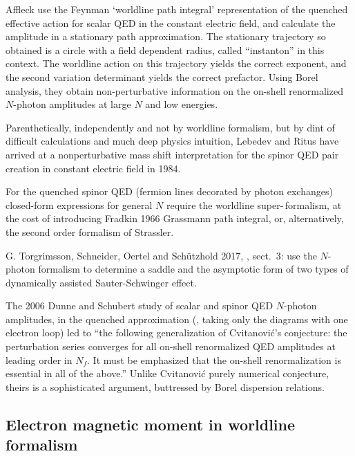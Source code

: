 Affleck \etal{} use the Feynman `worldline
path integral' representation of the quenched effective action for scalar
QED in the constant electric field, and calculate the amplitude in a
stationary path approximation. The stationary trajectory so obtained is a
circle with a field dependent radius, called ``instanton''  in this
context. The worldline action on this trajectory yields the correct
exponent, and the second variation determinant yields the correct  prefactor.
Using Borel analysis, they obtain non-perturbative information on the
on-shell renormalized $N$-photon amplitudes at large $N$ and low energies.

Parenthetically, independently and not by worldline formalism, but by
dint of difficult calculations and much deep physics intuition, Lebedev
and Ritus have arrived at a nonperturbative mass shift
interpretation for the spinor QED pair creation in constant electric
field in 1984.

For the quenched spinor QED (fermion lines decorated by photon exchanges)
closed-form expressions for general $N$ require the worldline
super-\,formalism, at the cost of introducing Fradkin
1966 Grassmann path integral,
or, alternatively,
the second order
formalism of Strassler.


    G. Torgrimsson, Schneider,  Oertel and Schützhold 2017,
, sect.~3:
use the $N$-photon formalism to determine a saddle and the asymptotic
form of two types of dynamically assisted {Sauter-Schwinger} effect.

The 2006 Dunne and Schubert study of scalar and spinor QED
$N$-photon amplitudes, in the quenched approximation (\ie, taking only
the diagrams with one electron loop) led to ``the following
generalization of Cvitanovi\'c's conjecture: the perturbation series
converges for all on-shell renormalized QED amplitudes at leading order
in $N_f$. It must be emphasized that the on-shell renormalization is
essential in all of the above.''
Unlike Cvitanovi\'c purely numerical conjecture, theirs is a
sophisticated argument, buttressed by Borel dispersion relations.



\subsection{Electron magnetic moment in worldline formalism}
\label{sect:magMomWorldline}

